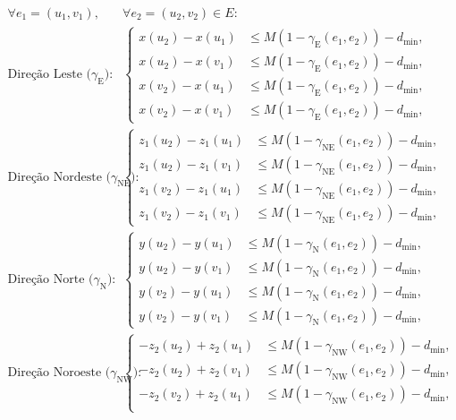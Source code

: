 \documentclass[cic,tc]{infufrgs}
\begin{document}
\begin{align}
\forall e_1 = (u_1, v_1), \quad &\forall e_2 = (u_2, v_2) \in E: \label{eq:crossing_coord} \\[0.4em]
\text{Direção Leste ($\gamma_{\text{E}}$):} \quad & \left\{ \begin{aligned}
x(u_2) - x(u_1) &\le M(1 - \gamma_{\text{E}}(e_1, e_2)) - d_{\text{min}}, \\
x(u_2) - x(v_1) &\le M(1 - \gamma_{\text{E}}(e_1, e_2)) - d_{\text{min}}, \\
x(v_2) - x(u_1) &\le M(1 - \gamma_{\text{E}}(e_1, e_2)) - d_{\text{min}}, \\
x(v_2) - x(v_1) &\le M(1 - \gamma_{\text{E}}(e_1, e_2)) - d_{\text{min}},
\end{aligned} \right. \nonumber \\[0.4em]
\text{Direção Nordeste ($\gamma_{\text{NE}}$):} \quad & \left\{ \begin{aligned}
z_1(u_2) - z_1(u_1) &\le M(1 - \gamma_{\text{NE}}(e_1, e_2)) - d_{\text{min}}, \\
z_1(u_2) - z_1(v_1) &\le M(1 - \gamma_{\text{NE}}(e_1, e_2)) - d_{\text{min}}, \\
z_1(v_2) - z_1(u_1) &\le M(1 - \gamma_{\text{NE}}(e_1, e_2)) - d_{\text{min}}, \\
z_1(v_2) - z_1(v_1) &\le M(1 - \gamma_{\text{NE}}(e_1, e_2)) - d_{\text{min}},
\end{aligned} \right. \nonumber \\[0.4em]
\text{Direção Norte ($\gamma_{\text{N}}$):} \quad & \left\{ \begin{aligned}
y(u_2) - y(u_1) &\le M(1 - \gamma_{\text{N}}(e_1, e_2)) - d_{\text{min}}, \\
y(u_2) - y(v_1) &\le M(1 - \gamma_{\text{N}}(e_1, e_2)) - d_{\text{min}}, \\
y(v_2) - y(u_1) &\le M(1 - \gamma_{\text{N}}(e_1, e_2)) - d_{\text{min}}, \\
y(v_2) - y(v_1) &\le M(1 - \gamma_{\text{N}}(e_1, e_2)) - d_{\text{min}},
\end{aligned} \right. \nonumber \\[0.4em]
\text{Direção Noroeste ($\gamma_{\text{NW}}$):} \quad & \left\{ \begin{aligned}
-z_2(u_2) + z_2(u_1) &\le M(1 - \gamma_{\text{NW}}(e_1, e_2)) - d_{\text{min}}, \\
-z_2(u_2) + z_2(v_1) &\le M(1 - \gamma_{\text{NW}}(e_1, e_2)) - d_{\text{min}}, \\
-z_2(v_2) + z_2(u_1) &\le M(1 - \gamma_{\text{NW}}(e_1, e_2)) - d_{\text{min}}, \\

\end{aligned}
\end{align}
\end{document}
